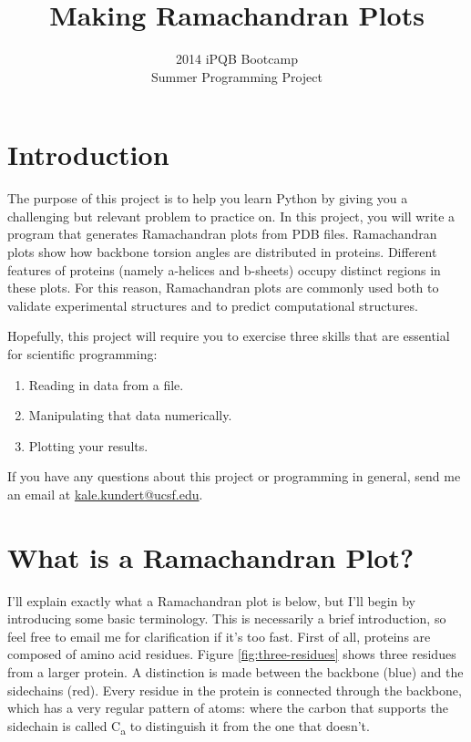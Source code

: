 \documentclass{article}
\newcommand{\calpha}{C\textsubscript{\textgreek{a}}}
\newcommand{\ahelices}{\textgreek{a}-helices}
\newcommand{\bsheets}{\textgreek{b}-sheets}
\begin{document}
\title{Making Ramachandran Plots}
\author{2014 iPQB Bootcamp\\Summer Programming Project}
\date{}
\maketitle{}

\section{Introduction}

The purpose of this project is to help you learn Python by giving you a
challenging but relevant problem to practice on.  In this project,
you will write a
program that generates Ramachandran plots from PDB files.  Ramachandran plots 
show how backbone torsion angles are distributed in proteins.  Different 
features of proteins (namely \ahelices{} and \bsheets{}) occupy distinct 
regions in these plots.  For this reason, Ramachandran plots are commonly used 
both to validate experimental structures and to predict computational 
structures.

Hopefully, this project will require you to exercise three skills that are 
essential for scientific programming:

\begin{enumerate}
 \item Reading in data from a file.
 \item Manipulating that data numerically.
 \item Plotting your results.
\end{enumerate}

If you have any questions about this project or programming in general, send me 
an email at \href{mailto:kale.kundert@ucsf.edu}{kale.kundert@ucsf.edu}.

\section{What is a Ramachandran Plot?}

I'll explain exactly what a Ramachandran plot is below, but I'll begin by 
introducing some basic terminology.  This is necessarily a brief introduction, 
so feel free to email me for clarification if it's too fast.  First of all, 
proteins are composed of amino acid residues.  Figure \ref{fig:three-residues} 
shows three residues from a larger protein.  A distinction is made between the 
backbone (blue) and the sidechains (red).  Every residue in the protein is 
connected through the backbone, which has a very regular pattern of atoms: 
 where the 
carbon that supports the sidechain is called \calpha{} to distinguish it from 
the one that doesn't.
\end{document}
